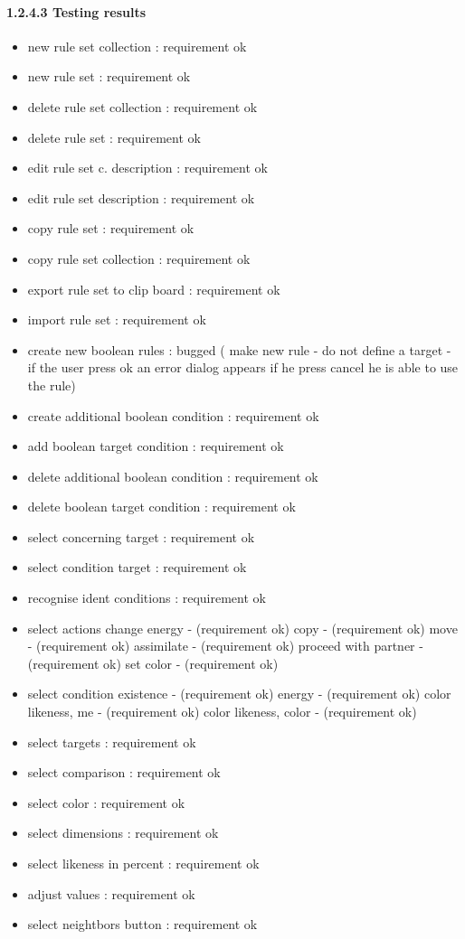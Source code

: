 \documentclass[titlepage,12pt]{scrartcl}
\begin{document}
\paragraph{1.2.4.3 Testing results}
\begin{itemize}
	\item new rule set collection 						: requirement ok
	\item new rule set												: requirement ok
	\item delete rule set collection					: requirement ok
	\item delete rule set											:	requirement ok
	\item edit rule set c. description				: requirement ok
	\item edit rule set description						:	requirement ok
	\item copy rule set												:	requirement ok
	\item copy rule set collection 						:	requirement ok
	\item export rule set to clip board 			: requirement ok
	\item import rule set 										: requirement ok
	\item create new boolean rules						: bugged ( make new rule - do not define a target - if the user press ok an error dialog appears if he press cancel he is able to use the rule)
	\item create additional boolean condition	:	requirement ok
	\item add boolean target condition				:	requirement ok
	\item delete additional boolean condition	:	requirement ok
	\item delete boolean target condition			:	requirement ok
	\item select concerning target						:	requirement ok
	\item select condition target							:	requirement ok
	\item recognise ident conditions					:	requirement ok
	\item select actions
	\subitem change energy - (requirement ok)
	\subitem copy - (requirement ok)
	\subitem move - (requirement ok)
	\subitem assimilate - (requirement ok)
	\subitem proceed with partner - (requirement ok)
	\subitem set color - (requirement ok)
	\item select condition
	\subitem existence - (requirement ok)
	\subitem energy - (requirement ok)
	\subitem color likeness, me - (requirement ok)
	\subitem color likeness, color - (requirement ok)
	\item select targets											:	requirement ok
	\item select comparison										:	requirement ok
	\item select color												:	requirement ok
	\item select dimensions										:	requirement ok	
	\item select likeness in percent					:	requirement ok
	\item adjust values												:	requirement ok		
	\item select neightbors button						:	requirement ok	
	

\end{itemize}
\end{document}
